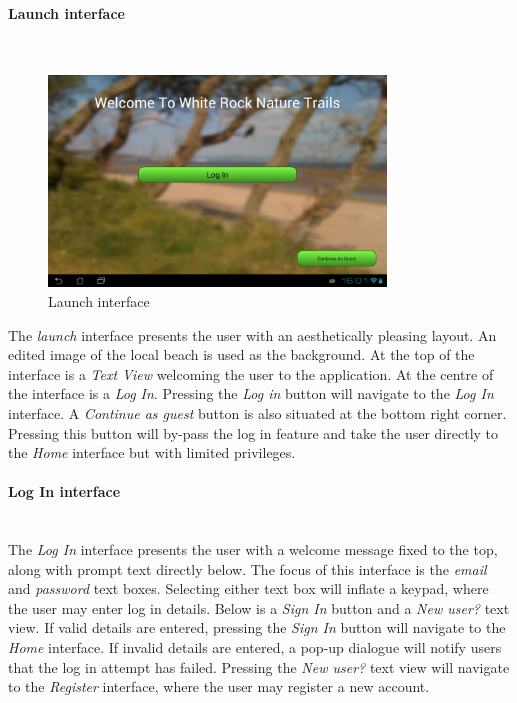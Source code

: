 \documentclass[11pt,a4paper]{report}
\begin{document}
\paragraph*{Launch interface}\mbox{}\\
\begin{figure}[H]
    \centering
    \includegraphics[width=0.8\textwidth]{chris/launch_view}
    \caption{Launch interface}
    \label{fig:launch_view}
\end{figure}

The \emph{launch} interface presents the user with an aesthetically pleasing layout. An edited image of the local beach is used as the background. At the top of the interface is a \emph{Text View} welcoming the user to the application. At the centre of the interface is a \emph{Log In}. Pressing the \emph{Log in} button will navigate to the \emph{Log In} interface. A \emph{Continue as guest} button is also situated at the bottom right corner. Pressing this button will by-pass the log in feature and take the user directly to the \emph{Home} interface but with limited privileges.

\paragraph*{Log In interface}\mbox{}\\

The \emph{Log In} interface presents the user with a welcome message fixed to the top, along with prompt text directly below. The focus of this interface is the \emph{email} and \emph{password} text boxes. Selecting either text box will inflate a keypad, where the user may enter log in details. Below is a \emph{Sign In} button and a \emph{New user?} text view. If valid details are entered, pressing the \emph{Sign In} button will navigate to the \emph{Home} interface. If invalid details are entered, a pop-up dialogue will notify users that the log in attempt has failed. Pressing the \emph{New user?} text view will navigate to the \emph{Register} interface, where the user may register a new account.
\end{document}
